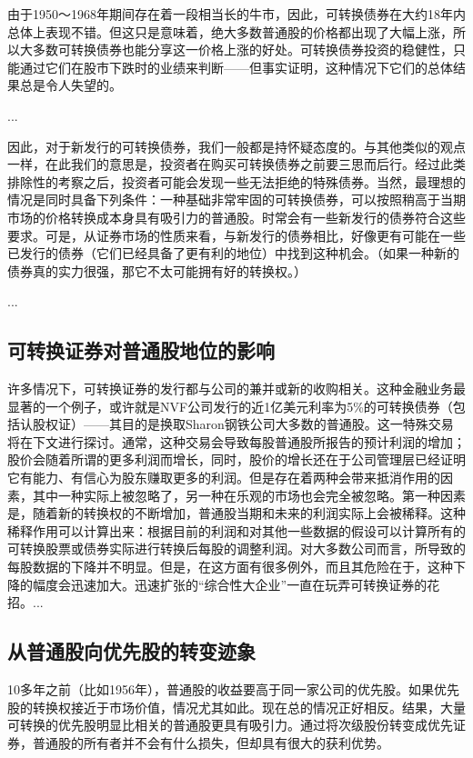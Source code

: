 \documentclass[12pt,oneside]{book}
\begin{document}
由于1950～1968年期间存在着一段相当长的牛市，因此，可转换债券在大约18年内总体上表现不错。但这只是意味着，绝大多数普通股的价格都出现了大幅上涨，所以大多数可转换债券也能分享这一价格上涨的好处。可转换债券投资的稳健性，只能通过它们在股市下跌时的业绩来判断——但事实证明，这种情况下它们的总体结果总是令人失望的。

...

因此，对于新发行的可转换债券，我们一般都是持怀疑态度的。与其他类似的观点一样，在此我们的意思是，投资者在购买可转换债券之前要三思而后行。经过此类排除性的考察之后，投资者可能会发现一些无法拒绝的特殊债券。当然，最理想的情况是同时具备下列条件：一种基础非常牢固的可转换债券，可以按照稍高于当期市场的价格转换成本身具有吸引力的普通股。时常会有一些新发行的债券符合这些要求。可是，从证券市场的性质来看，与新发行的债券相比，好像更有可能在一些已发行的债券（它们已经具备了更有利的地位）中找到这种机会。（如果一种新的债券真的实力很强，那它不太可能拥有好的转换权。）

...

\subsection{可转换证券对普通股地位的影响}
许多情况下，可转换证券的发行都与公司的兼并或新的收购相关。这种金融业务最显著的一个例子，或许就是NVF公司发行的近1亿美元利率为5\%的可转换债券（包括认股权证）——其目的是换取Sharon钢铁公司大多数的普通股。这一特殊交易将在下文进行探讨。通常，这种交易会导致每股普通股所报告的预计利润的增加；股价会随着所谓的更多利润而增长，同时，股价的增长还在于公司管理层已经证明它有能力、有信心为股东赚取更多的利润。但是存在着两种会带来抵消作用的因素，其中一种实际上被忽略了，另一种在乐观的市场也会完全被忽略。第一种因素是，随着新的转换权的不断增加，普通股当期和未来的利润实际上会被稀释。这种稀释作用可以计算出来：根据目前的利润和对其他一些数据的假设可以计算所有的可转换股票或债券实际进行转换后每股的调整利润。对大多数公司而言，所导致的每股数据的下降并不明显。但是，在这方面有很多例外，而且其危险在于，这种下降的幅度会迅速加大。迅速扩张的“综合性大企业”一直在玩弄可转换证券的花招。...


\subsection{从普通股向优先股的转变迹象}
10多年之前（比如1956年），普通股的收益要高于同一家公司的优先股。如果优先股的转换权接近于市场价值，情况尤其如此。现在总的情况正好相反。结果，大量可转换的优先股明显比相关的普通股更具有吸引力。通过将次级股份转变成优先证券，普通股的所有者并不会有什么损失，但却具有很大的获利优势。
\end{document}
